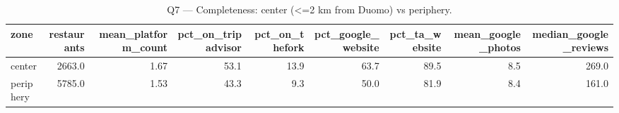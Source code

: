 \begin{table}[ht]
\centering
\caption{Q7 — Completeness: center (<=2 km from Duomo) vs periphery.}
\label{tab:q7_completeness_center_periphery}
{\tiny
\begin{tabular}{lrrrrrrrr}
\toprule
zone & restaurants & mean\_platform\_count & pct\_on\_tripadvisor & pct\_on\_thefork & pct\_google\_website & pct\_ta\_website & mean\_google\_photos & median\_google\_reviews \\
\midrule
center & 2663.0 & 1.67 & 53.1 & 13.9 & 63.7 & 89.5 & 8.5 & 269.0 \\
periphery & 5785.0 & 1.53 & 43.3 & 9.3 & 50.0 & 81.9 & 8.4 & 161.0 \\
\bottomrule
\end{tabular}
}
\end{table}
